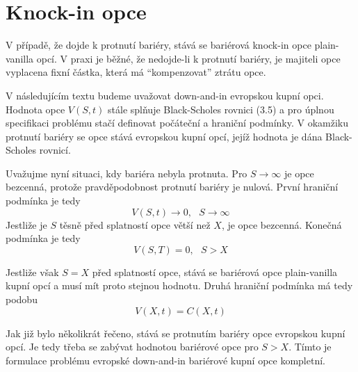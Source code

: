 \documentclass[a4paper]{book}
\begin{document}
\section{Knock-in opce}

V případě, že dojde k protnutí bariéry, stává se bariérová knock-in opce plain-vanilla opcí. V praxi je běžné, že nedojde-li k protnutí bariéry, je majiteli opce vyplacena fixní částka, která má ``kompenzovat'' ztrátu opce.

V následujícím textu budeme uvažovat down-and-in evropskou kupní opci. Hodnota opce $V(S,t)$ stále splňuje Black-Scholes rovnici (3.5) a pro úplnou specifikaci problému stačí definovat počáteční a hraniční podmínky. V okamžiku protnutí bariéry se opce stává evropskou kupní opcí, jejíž hodnota je dána Black-Scholes rovnicí.

Uvažujme nyní situaci, kdy bariéra nebyla protnuta. Pro $S \rightarrow \infty$ je opce bezcenná, protože pravděpodobnost protnutí bariéry je nulová. První hraniční podmínka je tedy
\begin{equation*}
V(S,t) \rightarrow 0, ~~~ S \rightarrow \infty
\end{equation*}
Jestliže je $S$ těsně před splatností opce větší než $X$, je opce bezcenná. Konečná podmínka je tedy
\begin{equation*}
V(S, T) = 0, ~~~ S > X
\end{equation*}

Jestliže však $S = X$ před splatností opce, stává se bariérová opce plain-vanilla kupní opcí a musí mít proto stejnou hodnotu. Druhá hraniční podmínka má tedy podobu
\begin{equation*}
V(X, t) = C(X,t)
\end{equation*}

Jak již bylo několikrát řečeno, stává se protnutím bariéry opce evropskou kupní opcí. Je tedy třeba se zabývat hodnotou bariérové opce pro $S > X$. Tímto je formulace problému evropské down-and-in bariérové kupní opce kompletní.
\end{document}
